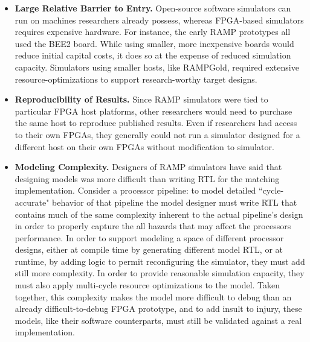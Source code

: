 \begin{itemize}
    \item \textbf{Large Relative Barrier to Entry.} Open-source software simulators can run on machines researchers already possess,
whereas FPGA-based simulators requires expensive hardware. For instance, the early RAMP prototypes all used
the BEE2 board. While using smaller, more inexpensive boards would reduce initial capital costs, it does so at the expense of reduced simulation capacity.
Simulators using smaller hosts, like RAMPGold, required extensive resource-optimizations to support research-worthy target designs.

\item \textbf{Reproducibility of Results.} Since RAMP simulators were tied to particular FPGA host
platforms, other researchers would need to purchase the same host to reproduce
published results. Even if researchers had access to their own FPGAs, they
generally could not run a simulator designed for a different host on their own
FPGAs without modification to simulator.

\item \textbf{Modeling Complexity.} Designers of RAMP simulators have said that
designing models was more difficult than writing RTL for the matching implementation.
Consider a processor pipeline: to model detailed ``cycle-accurate" behavior of that pipeline
the model designer must write RTL that contains much of the same complexity inherent to the actual pipeline's design in order
to properly capture the all hazards that may affect the processors performance.
In order to support modeling a space of different processor designs, either at
compile time by generating different model RTL, or at runtime, by
adding logic to permit reconfiguring the simulator, they must add still
more complexity.  In order to provide reasonable simulation capacity,
they must also apply multi-cycle resource optimizations to the model.
Taken together, this complexity makes the model more difficult to debug than an already difficult-to-debug FPGA prototype,
and to add insult to injury, these models, like their software counterparts, must still be validated against a real implementation.
\end{itemize}

%
%
%
%
%
%
%
%
%


